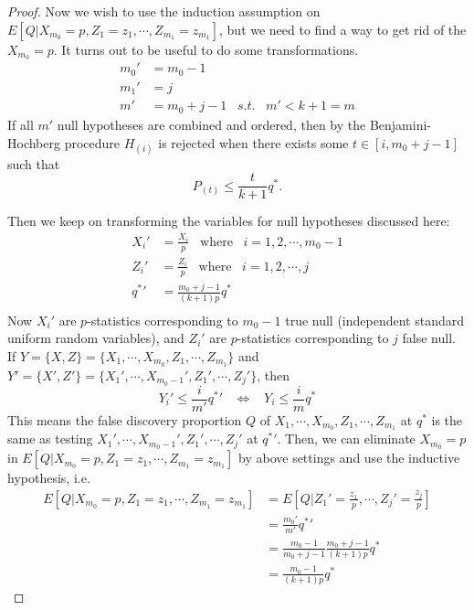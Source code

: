 \documentclass[12pt]{article}
\theoremstyle{plain}
\theoremstyle{definition}
\theoremstyle{remark}
\begin{document}
\begin{proof}
Now we wish to use the induction assumption on $E[Q|X_{m_0}=p,Z_1=z_1,\cdots,Z_{m_1}=z_{m_1}]$, but we need to find a way to get rid of the $X_{m_0}=p$. It turns out to be useful to do some transformations.
\begin{equation*}
    \begin{split}
    m_0'&=m_0-1\\
    m_1'&=j\\
    m'&=m_0+j-1 \;\;\;s.t.\;\;\; m'<k+1=m
    \end{split}
\end{equation*}
If all $m'$ null hypotheses are combined and ordered, then by the Benjamini-Hochberg procedure \(H_{(i)}\) is rejected when there exists some $t\in [i,m_0+j-1]$ such that  \[
P_{(t)}\leq \frac{t}{k+1}q^*.
\]

Then we keep on transforming the variables for null hypotheses discussed here:
\begin{equation*}
    \begin{split}
    X_i' &= \frac{X_i}{p}\;\;\; \text{where} \;\;\;i ={1,2,\cdots,m_0-1} \\
    Z_i' &= \frac{Z_i}{p}\;\;\; \text{where}\;\;\; i ={1,2,\cdots,j} \\
    {q^*}'&=\frac{m_0+j-1}{(k+1)p}q^*\\
    \end{split}
\end{equation*}
Now $X_i'$ are $p$-statistics corresponding to $m_0-1$ true null (independent standard uniform random variables), and $Z_i'$ are $p$-statistics corresponding to $j$ false null. If $Y=\{X,Z\}=\{X_1,\cdots,X_{m_0},Z_1,\cdots,Z_{m_1}\}$ and $Y'=\{X',Z'\}=\{X_1',\cdots,X_{m_0-1}',Z_1',\cdots,Z_{j}'\}$, then \[Y_i'\leq \frac{i}{m'}{q^*}'\;\;\;\iff\;\;\;Y_i\leq \frac{i}{m}q^*
\]
This means the false discovery proportion $Q$ of $X_1,\cdots,X_{m_0},Z_1,\cdots,Z_{m_1}$ at $q^*$ is the same as testing $X_1',\cdots,X_{m_0-1}',Z_1',\cdots,Z_{j}'$ at ${q^*}'$. Then, we can eliminate $X_{m_0}=p$ in  $E[Q|X_{m_0}=p,Z_1=z_1,\cdots,Z_{m_1}=z_{m_1}]$ by above settings and use the inductive hypothesis, i.e.
\begin{align*}
    E[Q|X_{m_0}=p,Z_1=z_1,\cdots,Z_{m_1}=z_{m_1}] 
    &=E\left[Q|Z_1'=\frac{z_1}{p},\cdots,Z_{j}'=\frac{z_j}{p}\right]\\
    &=\frac{m_0'}{m'}{q^*}'\\
    &=\frac{m_0-1}{m_0+j-1}\frac{m_0+j-1}{(k+1)p}q^*\\
    &=\frac{m_0-1}{(k+1)p}q^*
\end{align*}


\end{proof}
\end{document}

